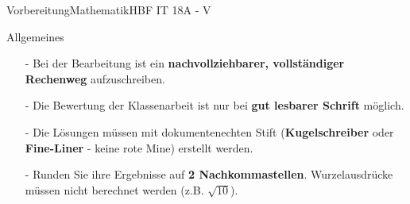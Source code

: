 \documentclass[oneside,openany,headings=optiontotoc,11pt,numbers=noenddot]{scrreprt}
\begin{document}
	\begin{test}{Vorbereitung}{Mathematik}{HBF IT 18A - V}
		\begin{framed}
			\noindent
			\scriptsize{Allgemeines
			\begin{itemize}[noitemsep,topsep=0pt]
				\item[-] Bei der Bearbeitung ist ein \textbf{nachvollziehbarer, vollständiger Rechenweg} aufzuschreiben.
				\item[-] Die Bewertung der Klassenarbeit ist nur bei \textbf{gut lesbarer Schrift} möglich.
				\item[-] Die Lösungen müssen mit dokumentenechten Stift (\textbf{Kugelschreiber} oder \textbf{Fine-Liner} - keine rote Mine) erstellt werden.
				\item[-] Runden Sie ihre Ergebnisse auf \textbf{2 Nachkommastellen}. Wurzelausdrücke müssen nicht berechnet werden (z.B. \(\sqrt{10}\)).\\
				

\end{itemize}}
\end{framed}
\end{test}
\end{document}
